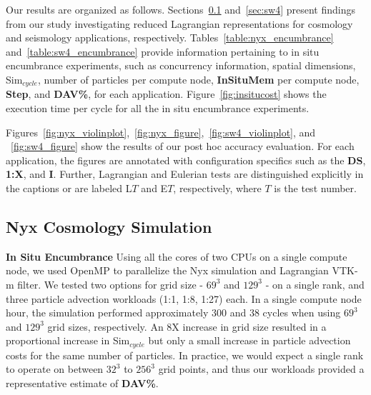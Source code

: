 Our results are organized as follows.
%
Sections~\ref{sec:nyx} and~\ref{sec:sw4} present findings from our study investigating reduced Lagrangian representations for cosmology and seismology applications, respectively.
%
%
Tables~\ref{table:nyx_encumbrance} and~\ref{table:sw4_encumbrance} provide information pertaining to in situ encumbrance experiments, such as concurrency information, spatial dimensions, Sim$_{cycle}$, number of particles per compute node, \textbf{InSituMem} per compute node, \textbf{Step}, and \textbf{DAV\%}, for each application. 
%
Figure~\ref{fig:insitucost} shows the execution time per cycle for all the in situ encumbrance experiments. %
%

%
Figures~\ref{fig:nyx_violinplot},~\ref{fig:nyx_figure},~\ref{fig:sw4_violinplot}, and ~\ref{fig:sw4_figure} show the results of our post hoc accuracy evaluation.
%
For each application, the figures are annotated with configuration specifics such as the \textbf{DS}, \textbf{1:X}, and \textbf{I}.
%
Further, Lagrangian and Eulerian tests are distinguished explicitly in the captions or are labeled L$T$ and E$T$, respectively, where $T$ is the test number.
%

\vspace{-1mm}
\subsection{Nyx Cosmology Simulation}
\label{sec:nyx}
\noindent\textbf{In Situ Encumbrance}
Using all the cores of two CPUs on a single compute node, we used OpenMP to parallelize the Nyx simulation and Lagrangian VTK-m filter.
%
We tested two options for grid size - $69^{3}$ and $129^{3}$ - on a single rank, and three particle advection workloads (1:1, 1:8, 1:27) each.
%
In a single compute node hour, the simulation performed approximately 300 and 38 cycles when using $69^{3}$ and $129^{3}$ grid sizes, respectively.
%
%
An 8X increase in grid size resulted in a proportional increase in Sim$_{cycle}$ but only a small increase in particle advection costs for the same number of particles.
%
In practice, we would expect a single rank to operate on between $32^{3}$ to $256^{3}$ grid points, and thus our workloads provided a representative estimate of \textbf{DAV\%}.
%

